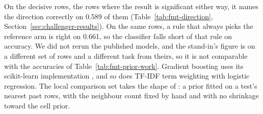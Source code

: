 On the decisive rows, the rows where the result is significant either way, it names the direction correctly on 0.589 of them (Table~\ref{tab:fmt-direction}, Section~\ref{sec:challenger-results}). On the same rows, a rule that always picks the reference arm is right on 0.661, so the classifier falls short of that rule on accuracy. We did not rerun the published models, and the stand-in's figure is on a different set of rows and a different task from theirs, so it is not comparable with the accuracies of Table~\ref{tab:fmt-prior-work}. Gradient boosting \cite{friedman2001greedy} uses its scikit-learn implementation \cite{pedregosa2011scikit}, and so does TF-IDF term weighting \cite{salton1988term} with logistic regression. The local comparison set takes the shape of \cite{li2025learning}: a prior fitted on a test's nearest past rows, with the neighbour count fixed by hand and with no shrinkage toward the cell prior.

\label{sec:related-more}
